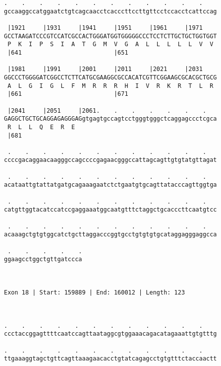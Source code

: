 \documentclass{article}
\begin{document}
\begin{Verbatim}
.    .    .    .    .    .    .    .    .    .    .    .    
gccaaggccatggaatctgtcagcaacctcacccttccttgttcctccacctcattccag
                                                            
 |1921     |1931     |1941     |1951     |1961     |1971    
GCCTAAGATCCCGTCCATCGCCACTGGGATGGTGGGGGCCCTCCTCTTGCTGCTGGTGGT
 P  K  I  P  S  I  A  T  G  M  V  G  A  L  L  L  L  L  V  V 
 |641                          |651                         
  
 |1981     |1991     |2001     |2011     |2021     |2031    
GGCCCTGGGGATCGGCCTCTTCATGCGAAGGCGCCACATCGTTCGGAAGCGCACGCTGCG
 A  L  G  I  G  L  F  M  R  R  R  H  I  V  R  K  R  T  L  R 
 |661                          |671                         
  
 |2041     |2051     |2061.    .    .    .    .    .    .   
GAGGCTGCTGCAGGAGAGGGAGgtgagtgccagtcctgggtgggctcaggagccctcgca
 R  L  L  Q  E  R  E                                        
 |681                                                       
  
 .    .    .    .    .    .    .    .    .    .    .    .   
ccccgacaggaacaagggccagccccgagaacgggccattagcagttgtgtatgttagat
                                                            
 .    .    .    .    .    .    .    .    .    .    .    .   
acataattgtattatgatgcagaaagaatctctgaatgtgcagttatacccagttggtga
                                                            
 .    .    .    .    .    .    .    .    .    .    .    .   
catgttggtacatccatccgaggaaatggcaatgtttctaggctgcacccttcaatgtcc
                                                            
 .    .    .    .    .    .    .    .    .    .    .    .   
acaaagctgtgtggcatctgcttaggacccggtgcctgtgtgtgcataggagggaggcca
                                                            
 .    .    .    .    .
ggaagcctggctgttgatccca
                      
                      
 
Exon 18 | Start: 159889 | End: 160012 | Length: 123



.    .    .    .    .    .    .    .    .    .    .    .    
ccctaccggagttttcaatccagttaataggcgtggaaacagacatagaaattgtgtttg
                                                            
.    .    .    .    .    .    .    .    .    .    .    .    
ttgaaaggtagctgttcagttaaagaacacctgtatcagagcctgtgtttctaccaactt
                                                            

\end{Verbatim}
\end{document}
